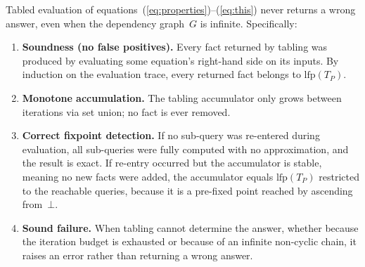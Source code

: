 \begin{theorem}%
  \label{thm:tabling-soundness}
  Tabled evaluation of
  equations~(\ref{eq:properties})--(\ref{eq:this})
  never returns a wrong answer, even when the
  dependency graph~$G$ is infinite.
  Specifically:
  \begin{enumerate}
    \item \textbf{Soundness (no false positives).}
      Every fact returned by tabling was produced by
      evaluating some equation's right-hand side on its
      inputs.
      By induction on the evaluation trace, every
      returned fact belongs to $\mathrm{lfp}(T_P)$.

    \item \textbf{Monotone accumulation.}
      The tabling accumulator only grows between
      iterations via set union; no fact is ever
      removed.

    \item \textbf{Correct fixpoint detection.}
      If no sub-query was re-entered during evaluation,
      all sub-queries were fully computed with no
      approximation, and the result is exact.
      If re-entry occurred but the accumulator is
      stable, meaning no new facts were added, the
      accumulator equals
      $\mathrm{lfp}(T_P)$ restricted to the reachable
      queries, because it is a pre-fixed point reached
      by ascending from~$\bot$.

    \item \textbf{Sound failure.}
      When tabling cannot determine the answer,
      whether because the iteration budget is exhausted
      or because of an infinite non-cyclic chain,
      it raises an error rather than
      returning a wrong answer.
  \end{enumerate}
\end{theorem}

